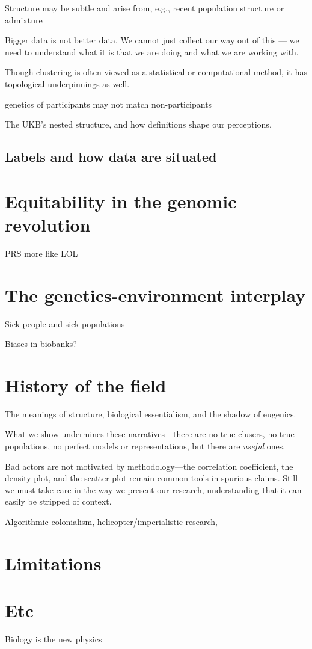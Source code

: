 Structure may be subtle and arise from, e.g., recent population structure or admixture\citep{gopalan_human_2022}

Bigger data is not better data. We cannot just collect our way out of this --- we need to understand what it is that we are doing and what we are working with.



Though clustering is often viewed as a statistical or computational method, it has topological underpinnings as well.

genetics of participants may not match non-participants
\citep{benonisdottir_studying_2023}

The UKB's nested structure, and how definitions shape our perceptions.

\subsection{Labels and how data are situated}



\section{Equitability in the genomic revolution}



PRS more like LOL\citep{kaplan_polygenic_2022}

\section{The genetics-environment interplay}

Sick people and sick populations\citep{rose_sick_2001}

Biases in biobanks?

\section{History of the field}

The meanings of structure, biological essentialism, and the shadow of eugenics.

What we show undermines these narratives---there are no true clusers, no true populations, no perfect models or representations, but there are \textit{useful} ones.

Bad actors are not motivated by methodology---the correlation coefficient, the density plot, and the scatter plot remain common tools in spurious claims. Still we must take care in the way we present our research, understanding that it can easily be stripped of context.

Algorithmic colonialism, helicopter/imperialistic research, 

\citep{gebru_race_2020}



\section{Limitations}

\section{Etc}

Biology is the new physics \citep{hunter_biology_2010}
